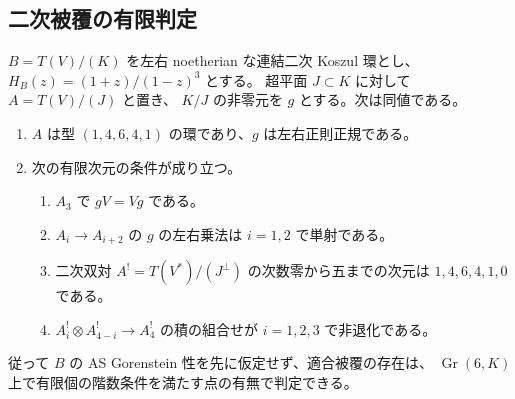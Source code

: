\subsection{二次被覆の有限判定}
\label{subsec:finite-ambient-test}

\begin{theorem}
\label{thm:finite-ambient-test}
$B=T(V)/(K)$ を左右 noetherian な連結二次 Koszul 環とし、
$H_B(z)=(1+z)/(1-z)^3$ とする。
超平面 $J\subset K$ に対して $A=T(V)/(J)$ と置き、
$K/J$ の非零元を $g$ とする。次は同値である。
\begin{enumerate}
\item $A$ は型 $(1,4,6,4,1)$ の環であり、$g$ は左右正則正規である。
\item 次の有限次元の条件が成り立つ。
\begin{enumerate}
\item $A_3$ で $gV=Vg$ である。
\item $A_i\to A_{i+2}$ の $g$ の左右乗法は $i=1,2$ で単射である。
\item 二次双対 $A^!=T(V^*)/(J^\perp)$ の次数零から五までの次元は
$1,4,6,4,1,0$ である。
\item $A^!_i\otimes A^!_{4-i}\to A^!_4$ の積の組合せが $i=1,2,3$ で非退化である。
\end{enumerate}
\end{enumerate}
従って $B$ の AS Gorenstein 性を先に仮定せず、適合被覆の存在は、
$\operatorname{Gr}(6,K)$ 上で有限個の階数条件を満たす点の有無で判定できる。
\end{theorem}

